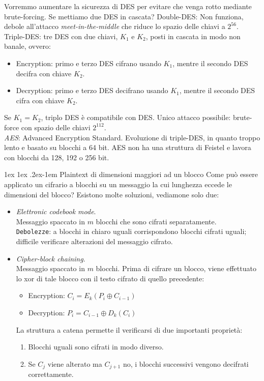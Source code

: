 \documentclass[a4paper, 11pt, notitlepage, fleqn]{report}
\makeatletter
\renewcommand{\paragraph}{%
	\@startsection{paragraph}{4}%
	{\z@}{1ex \@plus 1ex \@minus .2ex}{-1em}%
	{\normalfont\normalsize\bfseries}%
}
\makeatother
\begin{document}
Vorremmo aumentare la sicurezza di DES per evitare che venga rotto mediante brute-forcing. Se mettiamo due DES in cascata? Double-DES: Non funziona, debole all'attacco \emph{meet-in-the-middle} che riduce lo spazio delle chiavi a $2^{56}$.\\
Triple-DES: tre DES  con due chiavi, $K_1$ e $K_2$, posti in cascata in modo non banale, ovvero:
\begin{itemize}
	\item Encryption: primo e terzo DES cifrano usando $K_1$, mentre il secondo DES decifra con chiave $K_2$.
	\item Decryption: primo e terzo DES decifrano usando $K_1$, mentre il secondo DES cifra con chiave $K_2$.
\end{itemize}
Se $K_1 = K_2$, triplo DES è compatibile con DES. Unico attacco possibile: brute-force con spazio delle chiavi $2^{112}$.\\

\noindent\emph{AES}: Advanced Encryption Standard. Evoluzione di triple-DES, in quanto troppo lento e basato su blocchi a 64 bit. AES non ha una struttura di Feistel e lavora con blocchi da 128, 192 o 256 bit.

\paragraph{Plaintext di dimensioni maggiori ad un blocco}
Come può essere applicato un cifrario a blocchi su un messaggio la cui lunghezza eccede le dimensioni del blocco? Esistono molte soluzioni, vediamone solo due:
\begin{itemize}
	\item \emph{Elettronic codebook mode}.\\
	Messaggio spaccato in $m$ blocchi che sono cifrati separatamente.\\
	\texttt{Debolezze}: a blocchi in chiaro uguali corrispondono blocchi cifrati uguali; difficile verificare alterazioni del messaggio cifrato.
	\item \emph{Cipher-block chaining}.\\
	Messaggio spaccato in $m$ blocchi. Prima di cifrare un blocco, viene effettuato lo xor di tale blocco con il testo cifrato di quello precedente:
	\begin{itemize}
		\item[] Encryption: $C_i = E_k(P_i \oplus C_{i-1})$
		\item[] Decryption: $P_i = C_{i-1} \oplus D_k(C_i)$
	\end{itemize}
	La struttura a catena permette il verificarsi di due importanti proprietà:
	\begin{enumerate}
		\item Blocchi uguali sono cifrati in modo diverso.
		\item Se $C_j$ viene alterato ma $C_{j+1}$ no, i blocchi successivi vengono decifrati correttamente.
	\end{enumerate}
\end{itemize}
\end{document}
